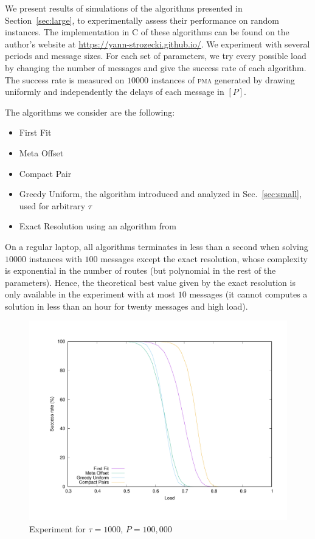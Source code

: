 \documentclass[a4paper,UKenglish,cleveref, autoref, thm-restate]{lipics-v2019}
\newcommand\pma{\textsc{pma}\xspace}
\begin{document}
We present results of simulations of the algorithms presented in Section~\ref{sec:large}, to experimentally assess their performance on random instances. The implementation in C of these algorithms can be found on the author's website at \url{https://yann-strozecki.github.io/}. We experiment with several periods and message sizes. For each set of parameters, we try every possible load by changing the number of messages and give the success rate of each algorithm. The success rate is measured on $10000$ instances of \pma generated by drawing uniformly and independently the delays of each message in $[P]$. 

The algorithms we consider are the following:
\begin{itemize}
  \item First Fit
  \item Meta Offset
  \item Compact Pair
  \item Greedy Uniform, the algorithm introduced and analyzed in Sec.~\ref{sec:small}, used for arbitrary $\tau$
  \item Exact Resolution using an algorithm from~\cite{dominique2018deterministic}  
\end{itemize}

On a regular laptop, all algorithms terminates in less than a second when solving $10000$ instances with $100$ messages except the exact resolution, whose complexity is exponential in the number of routes (but polynomial in the rest of the parameters). Hence, the theoretical best value given by the exact resolution is only available in the experiment with at most $10$ messages (it cannot computes a solution in less than an hour for twenty messages and high load). 

\begin{figure}
\begin{center}
\includegraphics[scale=0.3]{100messBig}
\end{center}
\caption{Experiment for $\tau = 1000$, $P=100,000$}
\label{fig:100messBig}
\end{figure}
\end{document}
